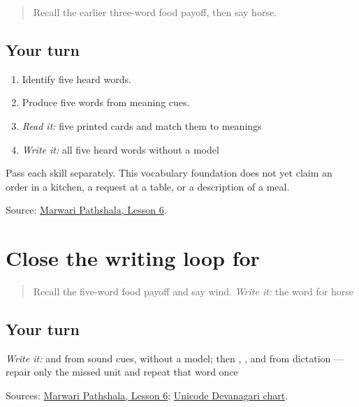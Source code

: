 \label{lesson:MW-C19-food-five}



\begin{quote}
Recall the earlier three-word food payoff, then say horse.
\end{quote}

\subsection*{Your turn}
\begin{enumerate}
\raggedright
  \item Identify five heard words.
  \item Produce five words from meaning cues.
  \item \emph{Read it:} five printed cards and match them to meanings
  \item \emph{Write it:} all five heard words without a model
\end{enumerate}

Pass each skill separately. This vocabulary foundation does not yet claim an order in a kitchen, a request at a table, or a description of a meal.

\begin{tcolorbox}[breakable,colback=teal!4,colframe=teal!35!black,title={Before you move on}]
Source: \href{https://www.marwaripathshala.com/marwari-lesson-6-english}{Marwari Pathshala, Lesson 6}.
\end{tcolorbox}
\section[Practice]{Close the writing loop for }

\label{lesson:MW-R19-script-close}



\begin{quote}
Recall the five-word food payoff and say wind. \emph{Write it:} the word for horse
\end{quote}

\subsection*{Your turn}
\emph{Write it:} \textbf{} and \textbf{} from sound cues, without a model; then \textbf{}, \textbf{}, and \textbf{} from dictation — repair only the missed unit and repeat that word once

\begin{tcolorbox}[breakable,colback=teal!4,colframe=teal!35!black,title={Before you move on}]
Sources: \href{https://www.marwaripathshala.com/marwari-lesson-6-english}{Marwari Pathshala, Lesson 6}; \href{https://www.unicode.org/charts/PDF/U0900.pdf}{Unicode Devanagari chart}.
\end{tcolorbox}
